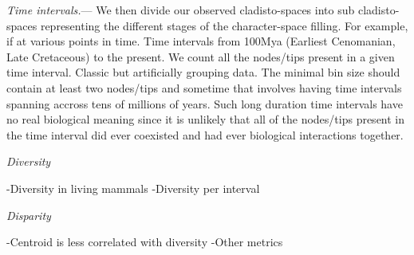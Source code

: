 \documentclass[12pt,letterpaper]{article}
\renewcommand{\subsection}[1]{%
\bigskip
\begin{center}
\begin{large}
\normalfont\itshape #1
\end{large}
\end{center}}
\renewcommand{\subsubsection}[1]{%
\vspace{2ex}
\noindent
\textit{#1.}---}
\begin{document}
\subsubsection{Time intervals}
We then divide our observed cladisto-spaces into sub cladisto-spaces representing the different stages of the character-space filling. For example, if at various points in time.
Time intervals from 100Mya (Earliest Cenomanian, Late Cretaceous) to the present.
We count all the nodes/tips present in a given time interval.
Classic but artificially grouping data. The minimal bin size should contain at least two nodes/tips and sometime that involves having time intervals spanning accross tens of millions of years. Such long duration time intervals have no real biological meaning since it is unlikely that all of the nodes/tips present in the time interval did ever coexisted and had ever biological interactions together.

\subsection{Diversity}
-Diversity in living mammals
-Diversity per interval

\subsection{Disparity}
-Centroid is less correlated with diversity
-Other metrics
\end{document}
